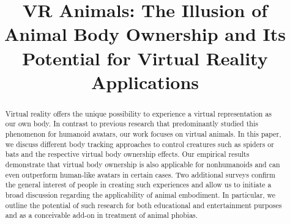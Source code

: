 \documentclass[acmtog,anonymous,review]{acmart}
\begin{document}
\title{VR Animals: The Illusion of Animal Body Ownership and Its Potential for Virtual Reality Applications}





\begin{abstract}
Virtual reality offers the unique possibility to experience a virtual representation as our own body. In contrast to previous research that predominantly studied this phenomenon for humanoid avatars, our work focuses on virtual animals. In this paper, we discuss different body tracking approaches to control creatures such as spiders or bats and the respective virtual body ownership effects. Our empirical results demonstrate that virtual body ownership is also applicable for nonhumanoids and can even outperform human-like avatars in certain cases. Two additional surveys confirm the general interest of people in creating such experiences and allow us to initiate a broad discussion regarding the applicability of animal embodiment. In particular, we outline the potential of such research for both educational and entertainment purposes and as a conceivable add-on in treatment of animal phobias.
\end{abstract}
\end{document}
